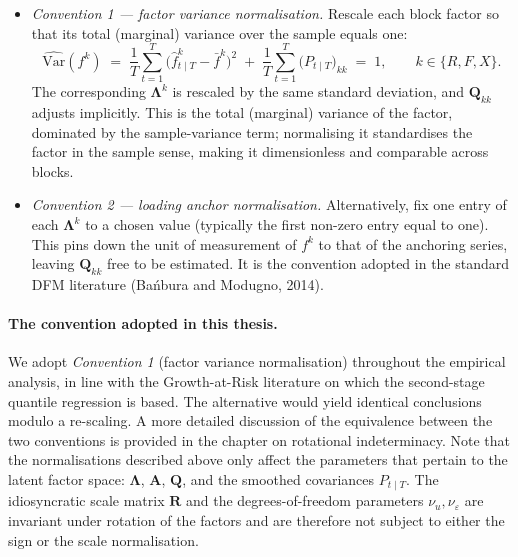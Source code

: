 \documentclass[11pt, a4paper, oneside]{article}
\newcommand{\mL}{\boldsymbol{\Lambda}}
\begin{document}
\begin{itemize}[leftmargin=1.5em, itemsep=4pt]
    \item \emph{Convention 1 — factor variance normalisation.}
          Rescale each block factor so that its total (marginal)
          variance over the sample equals one:
          \[
          \widehat{\mathrm{Var}}(f^k)
          \;=\; \frac{1}{T}\sum_{t=1}^{T}\big(\hat{f}^k_{t \mid T} - \bar{f}^k\big)^2
          \;+\; \frac{1}{T}\sum_{t=1}^{T}\big(P_{t \mid T}\big)_{kk}
          \;=\; 1, \qquad k \in \{R, F, X\}.
          \]
          The corresponding $\mL^k$ is rescaled by the same standard
          deviation, and $\mathbf{Q}_{kk}$ adjusts implicitly. This
          is the total (marginal) variance of the factor, dominated
          by the sample-variance term; normalising it standardises
          the factor in the sample sense, making it dimensionless and
          comparable across blocks. 
    \item \emph{Convention 2 — loading anchor normalisation.}
          Alternatively, fix one entry of each $\mL^k$ to a chosen
          value (typically the first non-zero entry equal to one).
          This pins down the unit of measurement of $f^k$ to that of
          the anchoring series, leaving $\mathbf{Q}_{kk}$ free to be
          estimated. It is the convention adopted in the standard
          DFM literature (Bańbura and Modugno, 2014).
\end{itemize}

\paragraph{The convention adopted in this thesis.}
We adopt \emph{Convention 1} (factor variance normalisation)
throughout the empirical analysis, in line with the Growth-at-Risk
literature on which the second-stage quantile regression is based.
The alternative would yield identical conclusions modulo a
re-scaling. A more detailed discussion of the equivalence between
the two conventions is provided in the chapter on rotational
indeterminacy.
Note that the normalisations described above only affect the
parameters that pertain to the latent factor space:
$\boldsymbol{\Lambda}$, $\mathbf{A}$, $\mathbf{Q}$, and the smoothed
covariances $P_{t \mid T}$. The idiosyncratic scale matrix
$\mathbf{R}$ and the degrees-of-freedom parameters
$\nu_u, \nu_\varepsilon$ are invariant under rotation of the factors
and are therefore not subject to either the sign or the scale
normalisation.
\end{document}
